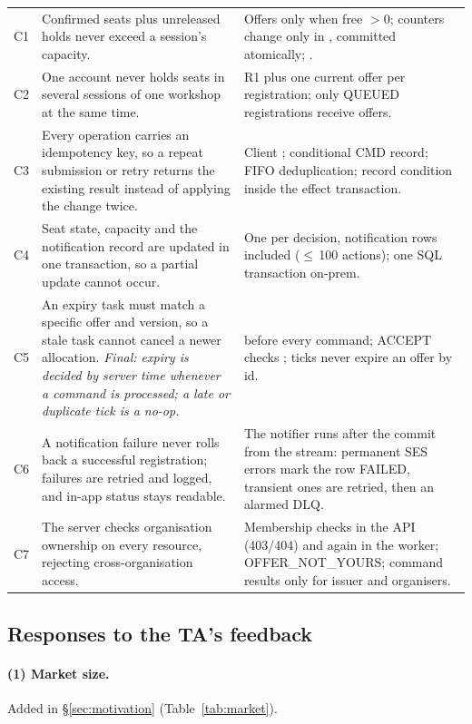\begin{table}[t]
\begin{tabularx}{\textwidth}{@{}l P{7.9cm} L@{}}
\midrule
C1 & Confirmed seats plus unreleased holds never exceed a session's capacity. & Offers only when free $> 0$; counters change only in , committed atomically; .\\
C2 & One account never holds seats in several sessions of one workshop at the same time. & R1 plus one current offer per registration; only QUEUED registrations receive offers.\\
C3 & Every operation carries an idempotency key, so a repeat submission or retry returns the existing result instead of applying the change twice. & Client ; conditional CMD record; FIFO deduplication; record condition inside the effect transaction.\\
C4 & Seat state, capacity and the notification record are updated in one transaction, so a partial update cannot occur. & One  per decision, notification rows included ($\leq$\,100 actions); one SQL transaction on-prem.\\
C5 & An expiry task must match a specific offer and version, so a stale task cannot cancel a newer allocation. \emph{Final: expiry is decided by server time whenever a command is processed; a late or duplicate tick is a no-op.} &  before every command; ACCEPT checks ; ticks never expire an offer by id.\\
C6 & A notification failure never rolls back a successful registration; failures are retried and logged, and in-app status stays readable. & The notifier runs after the commit from the stream: permanent SES errors mark the row FAILED, transient ones are retried, then an alarmed DLQ.\\
C7 & The server checks organisation ownership on every resource, rejecting cross-organisation access. & Membership checks in the API (403/404) and again in the worker; OFFER\_NOT\_YOURS; command results only for issuer and organisers.\\
\bottomrule
\end{tabularx}
\end{table}

\subsection{Responses to the TA's feedback}\label{sec:timers}
\paragraph{(1) Market size.} Added in \S\ref{sec:motivation} (Table~\ref{tab:market}).

